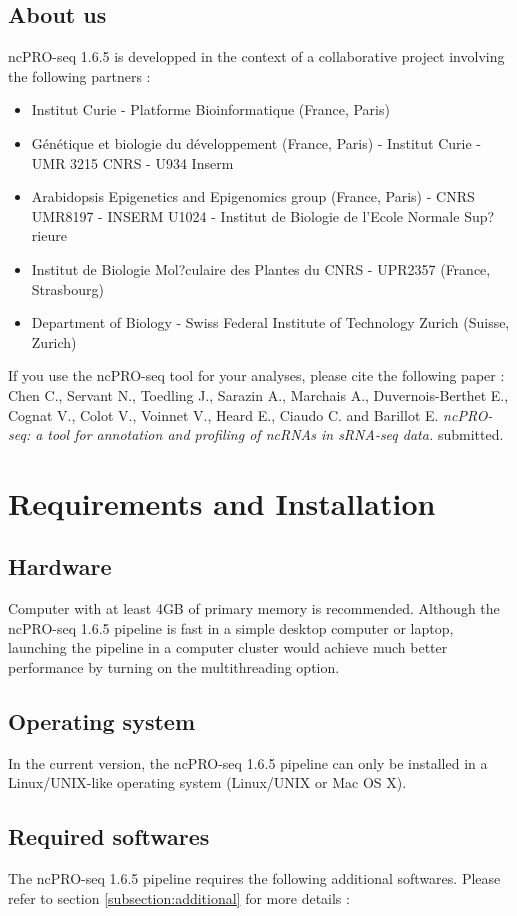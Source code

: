 \documentclass[12pt]{article}
\def \ncpip{ncPRO-seq 1.6.5}
\begin{document}
\subsection{About us}
\ncpip{} is developped in the context of a collaborative project involving the following partners :
\begin{itemize}
\item Institut Curie - Platforme Bioinformatique (France, Paris)
\item G\'en\'etique et biologie du d\'eveloppement (France, Paris) - Institut Curie - UMR 3215 CNRS - U934 Inserm 
\item Arabidopsis Epigenetics and Epigenomics group (France, Paris) - CNRS UMR8197 - INSERM U1024 - Institut de Biologie de l'Ecole Normale Sup?rieure 
\item Institut de Biologie Mol?culaire des Plantes du CNRS - UPR2357 (France, Strasbourg)  
\item Department of Biology - Swiss Federal Institute of Technology Zurich (Suisse, Zurich)  
\end{itemize}

\noindent If you use the ncPRO-seq tool for your analyses, please cite the following paper :\\
Chen C., Servant N., Toedling J., Sarazin A., Marchais A., Duvernois-Berthet E., Cognat V., Colot V., Voinnet V., Heard E., Ciaudo C. and Barillot E. \textit{ncPRO-seq: a tool for annotation and profiling of ncRNAs in sRNA-seq data.} submitted. 


\section{Requirements and Installation}
\subsection{Hardware}
Computer with at least 4GB of primary memory is recommended. Although the \ncpip{} pipeline is fast in a simple desktop computer or laptop, launching the pipeline in a computer cluster would achieve much better performance by turning on the multithreading option.
\subsection{Operating system}
In the current version, the \ncpip{} pipeline can only be installed in a Linux/UNIX-like operating system (Linux/UNIX or Mac OS X).
\subsection{Required softwares}
\label{subsection:prerequired}
The \ncpip{} pipeline requires the following additional softwares. Please refer to section \ref{subsection:additional} for more details :
\end{document}
